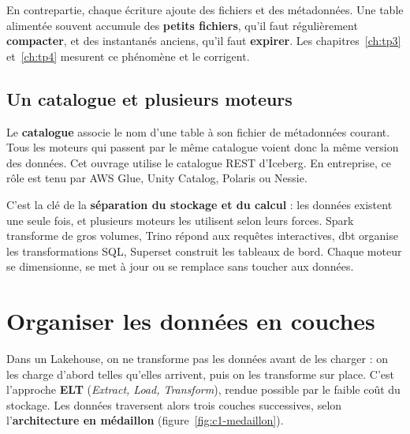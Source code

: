 En contrepartie, chaque écriture ajoute des fichiers et des métadonnées. Une table alimentée souvent
accumule des \textbf{petits fichiers}, qu'il faut régulièrement
\textbf{compacter}, et des instantanés anciens, qu'il faut \textbf{expirer}. Les chapitres~\ref{ch:tp3}
et~\ref{ch:tp4} mesurent ce phénomène et le corrigent.

\subsection{Un catalogue et plusieurs moteurs}

Le \textbf{catalogue} associe le nom d'une table à son fichier de métadonnées
courant. Tous les moteurs qui passent par le même catalogue voient donc la même version des
données. Cet ouvrage utilise le catalogue REST d'Iceberg. En entreprise, ce rôle est tenu par AWS
Glue, Unity Catalog, Polaris ou Nessie.

C'est la clé de la \textbf{séparation du stockage et du calcul} : les données existent une seule fois, et plusieurs moteurs les utilisent selon leurs
forces. Spark transforme de gros volumes, Trino répond aux requêtes interactives, dbt organise les
transformations SQL, Superset construit les tableaux de bord. Chaque moteur se dimensionne, se met à
jour ou se remplace sans toucher aux données.

\section{Organiser les données en couches}\label{sec:c1-medaillon}

Dans un Lakehouse, on ne transforme pas les données avant de les charger : on les charge d'abord
telles qu'elles arrivent, puis on les transforme sur place. C'est l'approche
\textbf{ELT} (\emph{Extract, Load, Transform}), rendue possible par le faible coût du
stockage. Les données traversent alors trois couches successives, selon l'\textbf{architecture en
médaillon} (figure~\ref{fig:c1-medaillon}).

